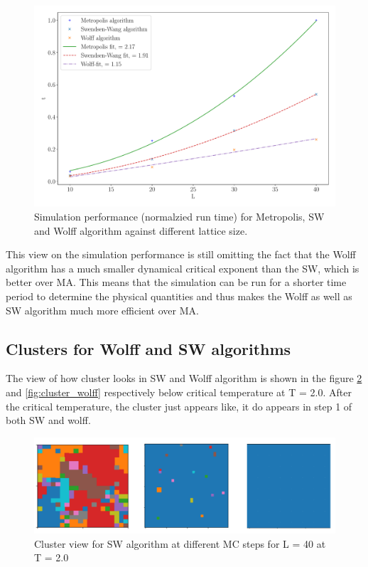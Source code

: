 \documentclass[a4paper,8pt]{article}
\begin{document}
\begin{figure}[htbp]
    \centering
    \includegraphics[scale = 0.35]{sim_performancewith_coeff.pdf}
    \caption{Simulation performance (normalzied run time) for Metropolis, SW and Wolff algorithm against different lattice size.}
    \label{fig:plot29}
\end{figure}

This view on the simulation performance is still omitting the fact that the Wolff algorithm has a much smaller dynamical critical exponent than the SW, which is better over MA. This means that the simulation can be run for a shorter time period to determine the physical quantities and thus makes the Wolff as well as SW algorithm much more efficient over MA.

\subsection{Clusters for Wolff and SW algorithms}
The view of how cluster looks in SW and Wolff algorithm is shown in the figure \ref{fig:cluster_sw} and \ref{fig:cluster_wolff} respectively below critical temperature at T = 2.0. After the critical temperature, the cluster just appears like, it do appears in step 1 of both SW and wolff. 

\begin{figure}
    \centering
    \includegraphics[width=0.75\linewidth]{SW algorithm.png}
    \caption{Cluster view for SW algorithm at different MC steps for L = 40 at T = 2.0}
    \label{fig:cluster_sw}
\end{figure}
\end{document}
